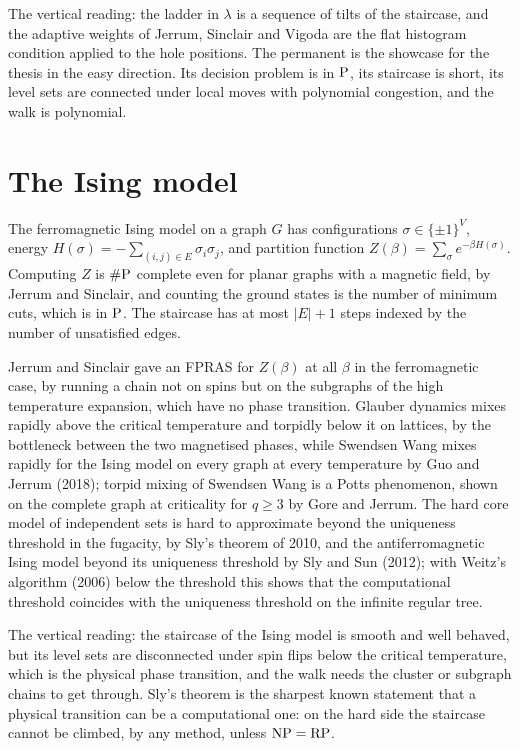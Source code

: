 The vertical reading: the ladder in $\lambda$ is a sequence of tilts of the staircase, and the adaptive weights of Jerrum, Sinclair and Vigoda are the flat histogram condition applied to the hole positions. The permanent is the showcase for the thesis in the easy direction. Its decision problem is in $\mathrm{P}$, its staircase is short, its level sets are connected under local moves with polynomial congestion, and the walk is polynomial.

\section{The Ising model}

The ferromagnetic Ising model on a graph $G$ has configurations $\sigma \in \{\pm 1\}^V$, energy $H(\sigma) = -\sum_{(i,j) \in E} \sigma_i \sigma_j$, and partition function $Z(\beta) = \sum_\sigma e^{-\beta H(\sigma)}$. Computing $Z$ is $\#\mathrm{P}$ complete even for planar graphs with a magnetic field, by Jerrum and Sinclair, and counting the ground states is the number of minimum cuts, which is in $\mathrm{P}$. The staircase has at most $|E| + 1$ steps indexed by the number of unsatisfied edges.

Jerrum and Sinclair gave an FPRAS for $Z(\beta)$ at all $\beta$ in the ferromagnetic case, by running a chain not on spins but on the subgraphs of the high temperature expansion, which have no phase transition. Glauber dynamics mixes rapidly above the critical temperature and torpidly below it on lattices, by the bottleneck between the two magnetised phases, while Swendsen Wang mixes rapidly for the Ising model on every graph at every temperature by Guo and Jerrum (2018); torpid mixing of Swendsen Wang is a Potts phenomenon, shown on the complete graph at criticality for $q \ge 3$ by Gore and Jerrum. The hard core model of independent sets is hard to approximate beyond the uniqueness threshold in the fugacity, by Sly's theorem of 2010, and the antiferromagnetic Ising model beyond its uniqueness threshold by Sly and Sun (2012); with Weitz's algorithm (2006) below the threshold this shows that the computational threshold coincides with the uniqueness threshold on the infinite regular tree.

The vertical reading: the staircase of the Ising model is smooth and well behaved, but its level sets are disconnected under spin flips below the critical temperature, which is the physical phase transition, and the walk needs the cluster or subgraph chains to get through. Sly's theorem is the sharpest known statement that a physical transition can be a computational one: on the hard side the staircase cannot be climbed, by any method, unless $\mathrm{NP} = \mathrm{RP}$.

